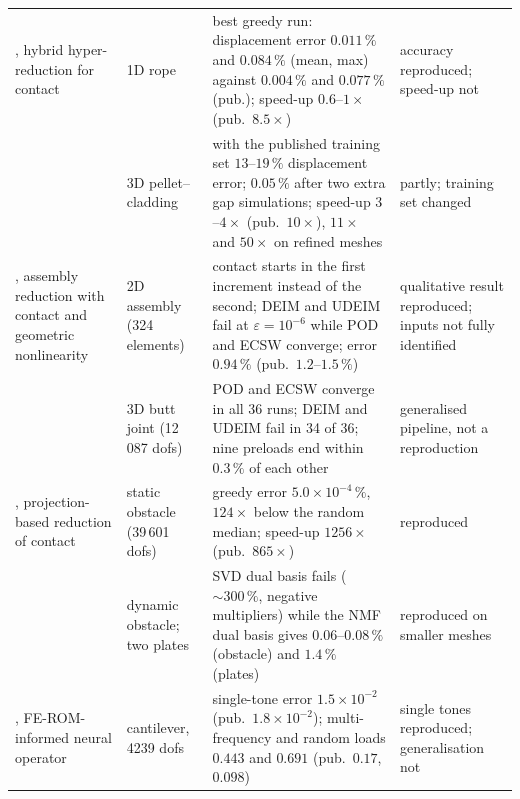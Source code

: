 \begin{table}[tbp]
\begin{tabularx}{\linewidth}{@{}>{\raggedright\arraybackslash}p{2.35cm} >{\raggedright\arraybackslash}p{2.4cm} >{\raggedright\arraybackslash}X >{\raggedright\arraybackslash}p{2.35cm}@{}}
\addlinespace
\citet{fauque2018hybrid}, hybrid hyper-reduction for contact & 1D rope & best greedy run: displacement error $0.011\,\%$ and $0.084\,\%$ (mean, max) against $0.004\,\%$ and $0.077\,\%$ (pub.); speed-up $0.6$--$1\times$ (pub.\ $8.5\times$) & accuracy reproduced; speed-up not \\
 & 3D pellet--cladding & with the published training set $13$--$19\,\%$ displacement error; $0.05\,\%$ after two extra gap simulations; speed-up $3$--$4\times$ (pub.\ $10\times$), $11\times$ and $50\times$ on refined meshes & partly; training set changed \\
\addlinespace
\citet{nikiema2026assembly}, assembly reduction with contact and geometric nonlinearity & 2D assembly (324 elements) & contact starts in the first increment instead of the second; DEIM and UDEIM fail at $\varepsilon=10^{-6}$ while POD and ECSW converge; error $0.94\,\%$ (pub.\ $1.2$--$1.5\,\%$) & qualitative result reproduced; inputs not fully identified \\
 & 3D butt joint (12\,087 dofs) & POD and ECSW converge in all 36 runs; DEIM and UDEIM fail in 34 of 36; nine preloads end within $0.3\,\%$ of each other & generalised pipeline, not a reproduction \\
\addlinespace
\citet{balajewicz2016contact}, projection-based reduction of contact & static obstacle (39\,601 dofs) & greedy error $5.0\times10^{-4}\,\%$, $124\times$ below the random median; speed-up $1256\times$ (pub.\ $865\times$) & reproduced \\
 & dynamic obstacle; two plates & SVD dual basis fails ($\sim300\,\%$, negative multipliers) while the NMF dual basis gives $0.06$--$0.08\,\%$ (obstacle) and $1.4\,\%$ (plates) & reproduced on smaller meshes \\
\addlinespace
\citet{yang2025frino}, FE-ROM-informed neural operator & cantilever, 4239 dofs & single-tone error $1.5\times10^{-2}$ (pub.\ $1.8\times10^{-2}$); multi-frequency and random loads $0.443$ and $0.691$ (pub.\ $0.17$, $0.098$) & single tones reproduced; generalisation not \\
\bottomrule
\end{tabularx}
\end{table}














